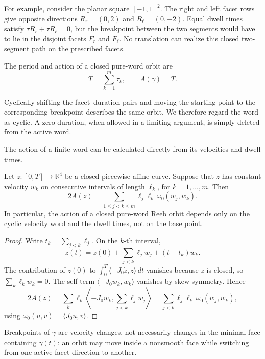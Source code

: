 For example, consider the planar square \([-1,1]^2\). The right and left
facet rows give opposite
directions \(R_r=(0,2)\) and \(R_\ell=(0,-2)\).  Equal dwell times satisfy
\(\tau R_r+\tau R_\ell=0\), but the breakpoint between the two segments would
have to lie in the disjoint facets \(F_r\) and \(F_\ell\).  No translation can
realize this closed two-segment path on the prescribed facets.

The period and action of a closed pure-word orbit are
\[
  T=\sum_{k=1}^m \tau_k,
  \qquad
  A(\gamma)=T.
\]


Cyclically shifting the facet--duration pairs and moving the starting point
to the corresponding breakpoint describes the same orbit. We therefore regard
the word as cyclic. A zero duration, when allowed in a limiting argument,
is simply deleted from the active word.

The action of a finite word can be calculated directly from its velocities and
dwell times.

\begin{lemma}\label{lem:preliminaries-shoelace}
Let \(z\colon[0,T]\to\mathbb{R}^4\) be a closed piecewise affine curve. Suppose
that \(z\) has constant velocity \(w_k\) on consecutive intervals of length
\(\ell_k\), for \(k=1,\ldots,m\). Then
\begin{equation}\label{eq:preliminaries-shoelace}
  2A(z)
  =
  \sum_{1\leq j<k\leq m}
    \ell_j\ell_k\,\omega_0(w_j,w_k).
\end{equation}
In particular, the action of a closed pure-word Reeb orbit depends only on the
cyclic velocity word and the dwell times, not on the base point.
\end{lemma}

\begin{proof}
Write \(t_k=\sum_{j<k}\ell_j\). On the \(k\)-th interval,
\[
  z(t)=z(0)+\sum_{j<k}\ell_jw_j+(t-t_k)w_k.
\]
The contribution of \(z(0)\) to
\(\int_0^T\langle -J_0\dot z,z\rangle\,dt\) vanishes because \(z\) is closed,
so \(\sum_k\ell_kw_k=0\). The self-term
\(\langle -J_0w_k,w_k\rangle\) vanishes by skew-symmetry. Hence
\[
  2A(z)
  =
  \sum_k
    \ell_k\left\langle -J_0w_k,\sum_{j<k}\ell_jw_j\right\rangle
  =
  \sum_{j<k}\ell_j\ell_k\,\omega_0(w_j,w_k),
\]
using \(\omega_0(u,v)=\langle J_0u,v\rangle\).
\end{proof}

Breakpoints of \(\dot{\gamma}\) are velocity changes, not necessarily changes
in the minimal face containing \(\gamma(t)\): an orbit may move inside a
nonsmooth face while switching from one active facet direction to another.

